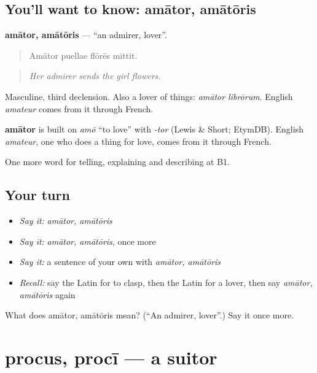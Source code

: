 \subsection*{You'll want to know: amātor, amātōris}
\textbf{amātor, amātōris} — \textquotedblleft{}an admirer, lover\textquotedblright{}.

\begin{quote}
Amātor puellae flōrēs mittit.
\end{quote}

\begin{quote}
\emph{Her admirer sends the girl flowers.}
\end{quote}

Masculine, third declension. Also a lover of things: \emph{amātor librōrum}. English \emph{amateur} comes from it through French.

\begin{cousinweb}
\textbf{amātor} is built on \emph{amō} \textquotedblleft{}to love\textquotedblright{} with \emph{-tor} (Lewis \& Short; EtymDB). English \emph{amateur}, one who does a thing for love, comes from it through French.
\end{cousinweb}

\begin{grammarlens}[title={What you've built}]
One more word for telling, explaining and describing at B1.
\end{grammarlens}

\subsection*{Your turn}
\begin{itemize}
\raggedright
  \item \emph{Say it:} \emph{amātor, amātōris}
  \item \emph{Say it:} \emph{amātor, amātōris}, once more
  \item \emph{Say it:} a sentence of your own with \emph{amātor, amātōris}
  \item \emph{Recall:} say the Latin for to clasp, then the Latin for a lover, then say \emph{amātor, amātōris} again
\end{itemize}

\begin{tcolorbox}[breakable,colback=teal!4,colframe=teal!35!black,title={Before you move on}]
What does amātor, amātōris mean? (\textquotedblleft{}An admirer, lover\textquotedblright{}.) Say it once more.
\end{tcolorbox}
\section[procus, procī]{procus, procī — a suitor}

